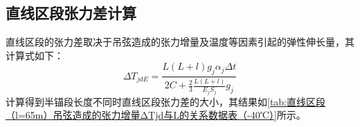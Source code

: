 \subsection{直线区段张力差计算}
直线区段的张力差取决于吊弦造成的张力增量及温度等因素引起的弹性伸长量，其计算式如下：
$$
\varDelta T_{jdE}=\frac{L(L+l)g_j\alpha _j\varDelta t}{2C+\frac{2}{3}\frac{L(L+l)}{E_jS_j}g_j}
$$
计算得到半锚段长度不同时直线区段张力差的大小，其结果如\ref{tab:直线区段（l=65m）吊弦造成的张力增量ΔTjd与L的关系数据表（-40℃）}所示。
\begin{table}[h]
	\centering
	\caption{直线区段（l=65m）张力差ΔTjdE与L的关系数据表（-40℃）
	}
	\label{tab:直线区段（l=65m）张力差ΔTjdE与L的关系数据表（-40℃）}
\end{table}


